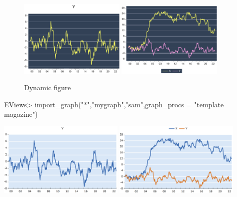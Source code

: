 \documentclass[
]{article}
\newenvironment{Shaded}{\begin{snugshade}}{\end{snugshade}}
\newcommand{\AttributeTok}[1]{\textcolor[rgb]{0.77,0.63,0.00}{#1}}
\newcommand{\FunctionTok}[1]{\textcolor[rgb]{0.00,0.00,0.00}{#1}}
\newcommand{\NormalTok}[1]{#1}
\newcommand{\SpecialCharTok}[1]{\textcolor[rgb]{0.00,0.00,0.00}{#1}}
\newcommand{\StringTok}[1]{\textcolor[rgb]{0.31,0.60,0.02}{#1}}
\begin{document}
\begin{figure}[h]

{\centering \includegraphics[width=0.45\textwidth]{test_engEviews_files/figure-latex//sagirumati-sam-eviewsr_graph} \includegraphics[width=0.45\textwidth]{test_engEviews_files/figure-latex//sagirumati-sam-graph1}

}

\caption{Dynamic figure}\label{fig:sagirumati}
\end{figure}

\begin{Shaded}
\begin{Highlighting}[]
\NormalTok{EViews}\SpecialCharTok{\textgreater{}} \FunctionTok{import\_graph}\NormalTok{(}\StringTok{"*"}\NormalTok{,}\StringTok{"mygraph"}\NormalTok{,}\StringTok{"sam"}\NormalTok{,}\AttributeTok{graph\_procs =} \StringTok{"template magazine"}\NormalTok{)}
\end{Highlighting}
\end{Shaded}

\includegraphics[width=0.45\textwidth]{test_engEviews_files/figure-latex//grap-EVIEWSR_GRAPH} \includegraphics[width=0.45\textwidth]{test_engEviews_files/figure-latex//grap-GRAPH1}
\end{document}
